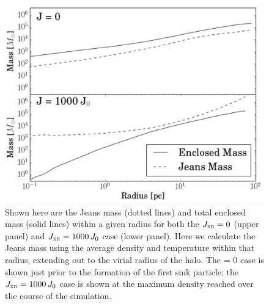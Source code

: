 \documentclass[../thesis.tex]{subfiles}
\begin{document}
\begin{figure}
  \begin{center}
    \includegraphics[width=\columnwidth]{figures/halo/blowout}   
    \caption{Shown
      here are the Jeans mass (dotted lines) and total enclosed mass
      (solid lines) within a given radius for  both the $J_{\textsc{xr}} = 0$ (upper panel) and $J_{\textsc{xr}} = 1000\,J_0$ case (lower panel). Here we calculate the Jeans mass using the average density and temperature within that radius, extending out to the virial radius of the halo.  The \jxr = 0 case is shown just prior to the formation of the first sink particle; the $J_{\textsc{xr}} = 1000\,J_0$ case is shown at the maximum density reached over the course of the simulation.}
    \label{suppressed}
  \end{center}
\end{figure}
\end{document}
